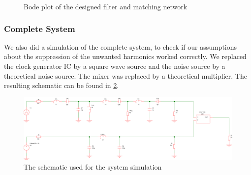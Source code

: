 \documentclass[a4paper, openany, oneside]{memoir}
\begin{document}
\begin{figure}[H]
\centering
{}
\caption{Bode plot of the designed filter and matching network}
\label{fig:plot_bode_filter}
\end{figure}

\subsubsection{Complete System}
We also did a simulation of the complete system, to check if our assumptions about the suppression of the unwanted harmonics worked correctly. We replaced the clock generator IC by a square wave source and the noise source by a theoretical noise source. The mixer was replaced by a theoretical multiplier. The resulting schematic can be found in \cref{fig:schematic_system_simulation}.

\begin{figure}[h]
    \centering
    \includegraphics[width=\textwidth]{fig_sim_system_schematic.pdf}
    \caption{The schematic used for the system simulation}
    \label{fig:schematic_system_simulation}
\end{figure}
\end{document}
